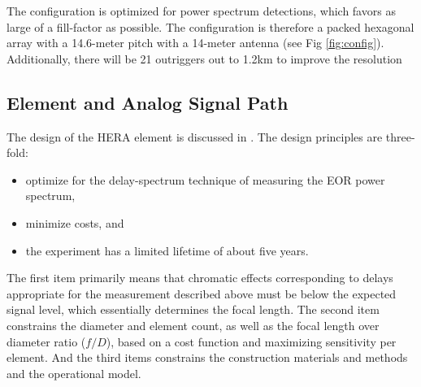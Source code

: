 \documentclass{article}
\begin{document}
The configuration is optimized for power spectrum detections, which favors as large of a fill-factor as possible.  The configuration is therefore a packed hexagonal array with a 14.6-meter pitch with a 14-meter antenna (see Fig \ref{fig:config}).  Additionally, there will be 21 outriggers out to 1.2km to improve the resolution 




\subsection{Element and Analog Signal Path}
\label{sec:element}
The design of the HERA element is discussed in \cite{heraMemo5}.  The design principles are three-fold:
\begin{itemize}
\item optimize for the delay-spectrum technique of measuring the EOR power spectrum,
\item minimize costs, and
\item the experiment has a limited lifetime of about five years.
\end{itemize}
The first item primarily means that chromatic effects corresponding to delays appropriate for the measurement described above must be below the expected signal level, which essentially determines the focal length.  The second item constrains the diameter and element count, as well as the focal length over diameter ratio ($f/D$), based on a cost function and maximizing sensitivity per element.  And the third items constrains the construction materials and methods and the operational model.
\end{document}
